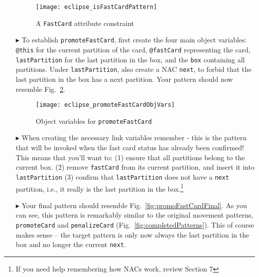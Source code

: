 \begin{itemize}
\begin{figure}[htp]
\begin{center}
  \texttt{[image: eclipse\_isFastCardPattern]}
  \caption{A \texttt{FastCard} attribute constraint}
  \label{fig:isFastCardPattern}
\end{center}
\end{figure}

\item[$\blacktriangleright$] To establish \texttt{promoteFastCard}, first create the four main object variables: \texttt{@this} for the
current partition of the card, \texttt{@fastCard} representing the card, \texttt{lastPartition} for the last partition in the box, and the \texttt{box}
containing all partitions. Under \texttt{lastPartition}, also create a NAC \texttt{next}, to forbid that the last partition in the box has a next partition.
Your pattern should now resemble Fig.~\ref{fig:objVarFastCard}.

\vspace{0.5cm}

\begin{figure}[htp]
\begin{center}
  \texttt{[image: eclipse\_promoteFastCardObjVars]}
  \caption{Object variables for \texttt{promoteFastCard}}
  \label{fig:objVarFastCard}
\end{center}
\end{figure}

\item[$\blacktriangleright$] When creating the necessary link variables remember - this is the pattern that will be invoked when the fast card status has
already been confirmed! This means that you'll want to:
(1) ensure that all partitions belong to the current box.
(2) remove \texttt{fastCard} from its current partition, and insert it into \texttt{lastPartition}
(3) confirm that \texttt{lastPartition} does not have a \texttt{next} partition, i.e., it really is the last partition in the box.\footnote{If you need help
remembering how NACs work, review Section 7}

\vspace{0.5cm}

\item[$\blacktriangleright$] Your final pattern should resemble Fig.~\ref{fig:promoFastCardFinal}. As you can see, this pattern is remarkably similar to the
original movement patterns, \texttt{pro\-mote\-Card} and \texttt{pen\-a\-lize\-Card} (Fig.~\ref{fig:completedPatterns}). This of course makes sense -- the
target pattern is only now always the last partition in the box and no longer the current \texttt{next}.


\end{itemize}
